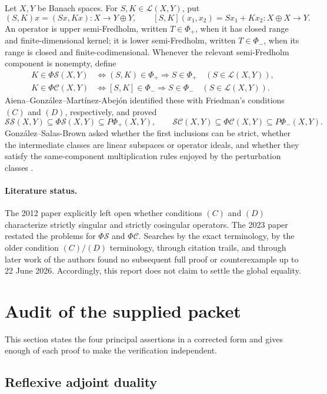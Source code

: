 \documentclass[11pt]{article}
\theoremstyle{definition}
\newcommand{\Lop}{\mathcal L}
\newcommand{\SSing}{\mathcal{SS}}
\newcommand{\SCos}{\mathcal{SC}}
\newcommand{\PhiS}{\Phi\mathcal S}
\newcommand{\PhiC}{\Phi\mathcal C}
\newcommand{\PhiP}{\Phi_+}
\newcommand{\PhiM}{\Phi_-}
\newcommand{\PPhiP}{P\Phi_+}
\newcommand{\PPhiM}{P\Phi_-}
\begin{document}
Let \(X,Y\) be Banach spaces.  For \(S,K\in\Lop(X,Y)\), put
\[
 (S,K)x=(Sx,Kx)\colon X\longrightarrow Y\oplus Y,
 \qquad
 [S,K](x_1,x_2)=Sx_1+Kx_2\colon X\oplus X\longrightarrow Y.
\]
An operator is upper semi-Fredholm, written \(T\in\PhiP\), when it has closed range and
finite-dimensional kernel; it is lower semi-Fredholm, written \(T\in\PhiM\), when its
range is closed and finite-codimensional.  Whenever the relevant semi-Fredholm component
is nonempty, define
\begin{align*}
 K\in\PhiS(X,Y)
 &\iff (S,K)\in\PhiP\Longrightarrow S\in\PhiP
       \quad(S\in\Lop(X,Y)),\\
 K\in\PhiC(X,Y)
 &\iff [S,K]\in\PhiM\Longrightarrow S\in\PhiM
       \quad(S\in\Lop(X,Y)).
\end{align*}
Aiena--Gonz\'alez--Mart\'inez-Abej\'on identified these with Friedman's conditions
\((C)\) and \((D)\), respectively, and proved
\[
 \SSing(X,Y)\subseteq\PhiS(X,Y)\subseteq\PPhiP(X,Y),
 \qquad
 \SCos(X,Y)\subseteq\PhiC(X,Y)\subseteq\PPhiM(X,Y).
\]
Gonz\'alez--Salas-Brown asked whether the first inclusions can be strict, whether the
intermediate classes are linear subspaces or operator ideals, and whether they satisfy the
same-component multiplication rules enjoyed by the perturbation classes
\cite{Aiena2012,GSB2023}.

\paragraph{Literature status.}
The 2012 paper explicitly left open whether conditions \((C)\) and \((D)\) characterize
strictly singular and strictly cosingular operators.  The 2023 paper restated the problems
for \(\PhiS\) and \(\PhiC\).  Searches by the exact terminology, by the older condition
\((C)/(D)\) terminology, through citation trails, and through later work of the authors
found no subsequent full proof or counterexample up to 22 June 2026.  Accordingly, this
report does not claim to settle the global equality.

\section{Audit of the supplied packet}

This section states the four principal assertions in a corrected form and gives enough of
each proof to make the verification independent.

\subsection{Reflexive adjoint duality}
\end{document}
